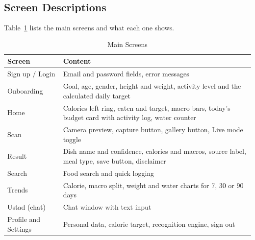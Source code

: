 \subsection{Screen Descriptions}
Table~\ref{tab:screens} lists the main screens and what each one shows.

\begin{table}[H]
\centering
\caption{Main Screens}
\label{tab:screens}
\small
\begin{tabularx}{\textwidth}{|>{\raggedright\arraybackslash}p{3.6cm}|>{\raggedright\arraybackslash}X|}
\hline
\textbf{Screen} & \textbf{Content} \\ \hline
Sign up / Login & Email and password fields, error messages \\ \hline
Onboarding & Goal, age, gender, height and weight, activity level and the calculated daily target \\ \hline
Home & Calories left ring, eaten and target, macro bars, today's budget card with activity log, water counter \\ \hline
Scan & Camera preview, capture button, gallery button, Live mode toggle \\ \hline
Result & Dish name and confidence, calories and macros, source label, meal type, save button, disclaimer \\ \hline
Search & Food search and quick logging \\ \hline
Trends & Calorie, macro split, weight and water charts for 7, 30 or 90 days \\ \hline
Ustad (chat) & Chat window with text input \\ \hline
Profile and Settings & Personal data, calorie target, recognition engine, sign out \\ \hline
\end{tabularx}
\end{table}

